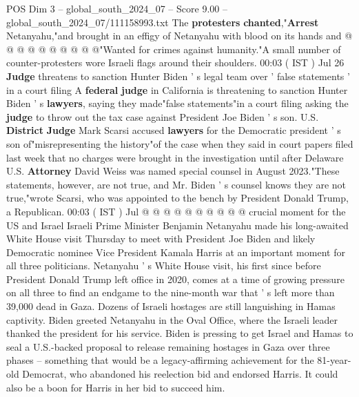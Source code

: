 \begin{textsample}{POS Dim 3 – global\_south\_2024\_07 – Score 9.00 – global\_south\_2024\_07/111158993.txt}
The \textbf{protesters} \textbf{chanted},"\textbf{Arrest} Netanyahu,"and brought in an effigy of Netanyahu with blood on its hands and @ @ @ @ @ @ @ @ @ @"Wanted for crimes against humanity."A small number of counter-protesters wore Israeli flags around their shoulders. 00:03 ( IST ) Jul 26 \textbf{Judge} threatens to sanction Hunter Biden ' s legal team over ' false statements ' in a court filing A \textbf{federal} \textbf{judge} in California is threatening to sanction Hunter Biden ' s \textbf{lawyers}, saying they made"false statements"in a court filing asking the \textbf{judge} to throw out the tax case against President Joe Biden ' s son.
U.S. \textbf{District} \textbf{Judge} Mark Scarsi accused \textbf{lawyers} for the Democratic president ' s son of"misrepresenting the history"of the case when they said in court papers filed last week that no charges were brought in the investigation until after Delaware U.S. \textbf{Attorney} David Weiss was named special counsel in August 2023."These statements, however, are not true, and Mr.
Biden ' s counsel knows they are not true,"wrote Scarsi, who was appointed to the bench by President Donald Trump, a Republican. 00:03 ( IST ) Jul @ @ @ @ @ @ @ @ @ @ crucial moment for the US and Israel Israeli Prime Minister Benjamin Netanyahu made his long-awaited White House visit Thursday to meet with President Joe Biden and likely Democratic nominee Vice President Kamala Harris at an important moment for all three politicians.
Netanyahu ' s White House visit, his first since before President Donald Trump left office in 2020, comes at a time of growing pressure on all three to find an endgame to the nine-month war that ' s left more than 39,000 dead in Gaza.
Dozens of Israeli hostages are still languishing in Hamas captivity.
Biden greeted Netanyahu in the Oval Office, where the Israeli leader thanked the president for his service.
Biden is pressing to get Israel and Hamas to seal a U.S.-backed proposal to release remaining hostages in Gaza over three phases -- something that would be a legacy-affirming achievement for the 81-year-old Democrat, who abandoned his reelection bid and endorsed Harris.
It could also be a boon for Harris in her bid to succeed him.

\end{textsample}
